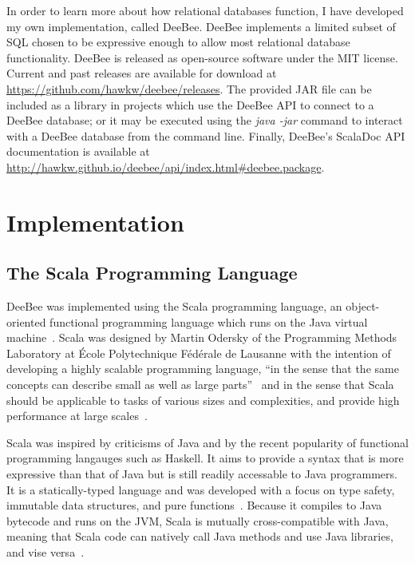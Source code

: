 In order to learn more about how relational databases function, I have developed my own implementation, called DeeBee. DeeBee implements a limited subset of SQL chosen to be expressive enough to allow most relational database functionality. 
DeeBee is released as open-source software under the MIT license. Current and past releases are available for download at \url{https://github.com/hawkw/deebee/releases}. The provided JAR file can be included as a library in projects which use the DeeBee API to connect to a DeeBee database; or it may be executed using the \textit{java -jar} command to interact with a DeeBee database from the command line. Finally, DeeBee's ScalaDoc API documentation is available at \url{http://hawkw.github.io/deebee/api/index.html#deebee.package}.

\section{Implementation}

\subsection{The Scala Programming Language}

DeeBee was implemented using the Scala programming language, an object-oriented functional programming language which runs on the Java virtual machine~\cite{odersky2004scala,odersky2004overview,odersky2008programming}. Scala was designed by Martin Odersky of the Programming Methods Laboratory at \'Ecole Polytechnique F\'ed\'erale de Lausanne with the intention of developing a highly scalable programming language, ``in the sense that the same concepts can describe small as well as large parts''~\cite{odersky2004scala} and in the sense that Scala should be applicable to tasks of various sizes and complexities, and provide high performance at large scales~\cite{odersky2008programming}. 

Scala was inspired by criticisms of Java and by the recent popularity of functional programming langauges such as Haskell. It aims to provide a syntax that is more expressive than that of Java but is still readily accessable to Java programmers. It is a statically-typed language and was developed with a focus on type safety, immutable data structures, and pure functions~\cite{odersky2004scala,odersky2004overview,odersky2008programming}. Because it compiles to Java bytecode and runs on the JVM, Scala is mutually cross-compatible with Java, meaning that Scala code can natively call Java methods and use Java libraries, and vise versa~\cite{odersky2008programming}.

